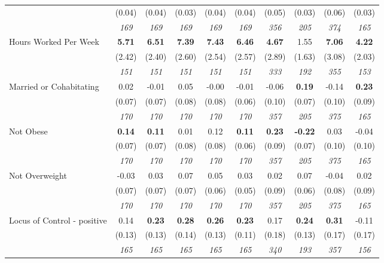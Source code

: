 \begin{tabular}{l c c c c c c c c c}
& (0.04) & (0.04) & (0.03) & (0.04) & (0.04) & (0.05) & (0.03) & (0.06) & (0.03) \\
& \textit{ 169 } & \textit{ 169 } & \textit{ 169 } & \textit{ 169 } & \textit{ 169 } & \textit{ 356 } & \textit{ 205 } & \textit{ 374 } & \textit{ 165 } \\
Hours Worked Per Week & \textbf{ 5.71 } & \textbf{ 6.51 } & \textbf{ 7.39 } & \textbf{7.43} & \textbf{6.46} & \textbf{ 4.67 } & 1.55 & \textbf{ 7.06 } & \textbf{4.22} \\
& (2.42) & (2.40) & (2.60) & (2.54) & (2.57) & (2.89) & (1.63) & (3.08) & (2.03) \\
& \textit{ 151 } & \textit{ 151 } & \textit{ 151 } & \textit{ 151 } & \textit{ 151 } & \textit{ 333 } & \textit{ 192 } & \textit{ 355 } & \textit{ 153 } \\
Married or Cohabitating & 0.02 & -0.01 & 0.05 & -0.00 & -0.01 & -0.06 & \textbf{0.19} & -0.14 & \textbf{0.23} \\
& (0.07) & (0.07) & (0.08) & (0.08) & (0.06) & (0.10) & (0.07) & (0.10) & (0.09) \\
& \textit{ 170 } & \textit{ 170 } & \textit{ 170 } & \textit{ 170 } & \textit{ 170 } & \textit{ 357 } & \textit{ 205 } & \textit{ 375 } & \textit{ 165 } \\
Not Obese & \textbf{ 0.14 } & \textbf{ 0.11 } & 0.01 & 0.12 & \textbf{0.11} & \textbf{ 0.23 } & \textbf{-0.22} & 0.03 & -0.04 \\
& (0.07) & (0.07) & (0.08) & (0.08) & (0.06) & (0.09) & (0.07) & (0.10) & (0.10) \\
& \textit{ 170 } & \textit{ 170 } & \textit{ 170 } & \textit{ 170 } & \textit{ 170 } & \textit{ 357 } & \textit{ 205 } & \textit{ 375 } & \textit{ 165 } \\
Not Overweight & -0.03 & 0.03 & 0.07 & 0.05 & 0.03 & 0.02 & 0.07 & -0.04 & 0.02 \\
& (0.07) & (0.07) & (0.07) & (0.06) & (0.05) & (0.09) & (0.06) & (0.08) & (0.09) \\
& \textit{ 170 } & \textit{ 170 } & \textit{ 170 } & \textit{ 170 } & \textit{ 170 } & \textit{ 357 } & \textit{ 205 } & \textit{ 375 } & \textit{ 165 } \\
Locus of Control - positive & 0.14 & \textbf{ 0.23 } & \textbf{ 0.28 } & \textbf{0.26} & \textbf{0.23} & 0.17 & \textbf{0.24} & \textbf{ 0.31 } & -0.11 \\
& (0.13) & (0.13) & (0.14) & (0.13) & (0.11) & (0.18) & (0.13) & (0.17) & (0.17) \\
& \textit{ 165 } & \textit{ 165 } & \textit{ 165 } & \textit{ 165 } & \textit{ 165 } & \textit{ 340 } & \textit{ 193 } & \textit{ 357 } & \textit{ 156 } \\

\end{tabular}
